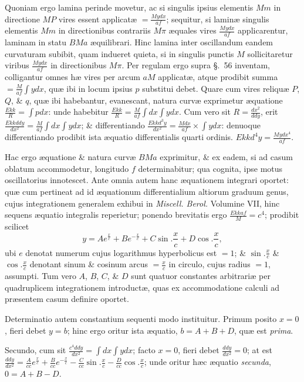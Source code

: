 Quoniam ergo lamina perinde movetur, ac si singulis ipsius elementis $Mm$ in directione $MP$ vires essent applicatæ $=\frac{Mydx}{af}$; sequitur, si laminæ singulis elementis $Mm$ in directionibus contrariis $M\pi$ æquales vires $\frac{Mydx}{af}$ applicarentur, laminam in statu $BMa$ æquilibrari. Hinc lamina inter oscillandum eandem curvaturam subibit, quam indueret quieta, si in
singulis punctis $M$ sollicitaretur viribus $\frac{Mydx}{af}$ in directionibus $M\pi$. Per regulam ergo supra §.~56 inventam, colligantur omnes hæ vires per arcum $aM$ applicatæ, atque prodibit summa $=\frac M{af}\int ydx$, quæ ibi in locum ipsius $p$ substitui debet. Quare cum vires reliquæ $P$, $Q$, \& $q$, quæ ibi habebantur, evanescant, natura curvæ exprimetur æquatione $\frac{Ekk}R=\int pdx$: unde habebitur $\frac{Ekk}R=\frac M{af}\int dx\int ydx$. Cum vero sit $R=\frac{dx^2}{ddy}$, erit $\frac{Ekkddy}{dx^2}=\frac M{af}\int dx\int ydx$; \& differentiando $\frac{Ekkd^3y}{dx^2}=\frac{Mdx}{af}\times\int ydx$: denuoque differentiando prodibit ista æquatio differentialis quarti ordinis. $Ekkd^4y=\frac{Mydx^4}{af}$.

Hac ergo æquatione \& natura curvæ $BMa$ exprimitur, \& ex eadem, si ad casum oblatum accommodetur, longitudo $f$ determinabitur; qua cognita, ipse motus oscillatorius innotescet. Ante omnia autem hanc æquationem integrari oportet: quæ cum pertineat ad id æquationum differentialium altiorum graduum genus, cujus integrationem generalem exhibui in \textit{Miscell. Berol.} Volumine VII, hinc sequens æquatio integralis reperietur; ponendo brevitatis ergo $\frac{Ekkaf}M=c^4$; prodibit scilicet
\[y=Ae^{\frac xc}+Be^{-\frac xc}+C\sin.\frac xc+D\cos.\frac xc,\]
ubi $e$ denotat numerum cujus logarithmus hyperbolicus est $=1$; \& $\sin.\frac xc$ \& $\cos.\frac xc$ denotant sinum \& cosinum arcus $=\frac xc$ in circulo, cujus radius $=1$, assumpti. Tum vero $A$, $B$, $C$, \& $D$ sunt quatuor constantes arbitrariæ per quadruplicem integrationem introductæ, quas ex accommodatione calculi ad præsentem casum definire oportet.

Determinatio autem constantium sequenti modo instituitur. Primum posito $x=0$, fieri debet $y=b$; hinc ergo oritur ista æquatio, $b=A+B+D$, quæ est \textit{prima}.

Secundo, cum sit $\frac{c^4ddy}{dx^2}=\int dx\int ydx$; facto $x=0$, fieri debet $\frac{ddy}{dx^2}=0$; at est $\frac{ddy}{dx^2}=\frac A{cc}e^{\frac xc}+\frac B{cc}e^{-\frac xc}-\frac C{cc}\sin.\frac xc-\frac D{cc}\cos.\frac xc$; unde oritur hæc æquatio \textit{secunda}, $0=A+B-D$.

